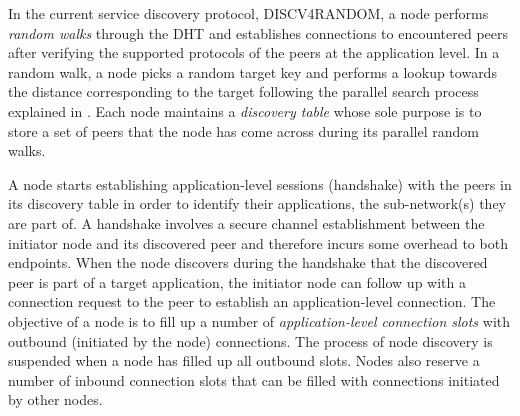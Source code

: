 In the current service discovery protocol, DISCV4RANDOM, a node performs \textit{random walks} through the DHT and establishes connections to encountered peers after verifying the supported protocols of the peers at the application level. In a random walk, a node picks a random target key and performs a lookup towards the distance corresponding to the target following the parallel search process explained in . Each node maintains a \textit{discovery table} whose sole purpose is to store a set of peers that the node has come across during its parallel random walks. %


A node starts establishing application-level sessions (\ie handshake) with the peers in its discovery table in order to identify their applications, \ie the sub-network(s) they are part of. A handshake involves a secure channel establishment between the initiator node and its discovered peer and therefore incurs some overhead to both endpoints. When the node discovers during the handshake that the discovered peer is part of a target application, the initiator node can follow up with a connection request to the peer to establish an application-level connection. The objective of a node is to fill up a number of \textit{application-level connection slots} with outbound (\ie initiated by the node) connections. The process of node discovery is suspended when a node has filled up all outbound slots. Nodes also reserve a number of inbound connection slots that can be filled with connections initiated by other nodes. 


